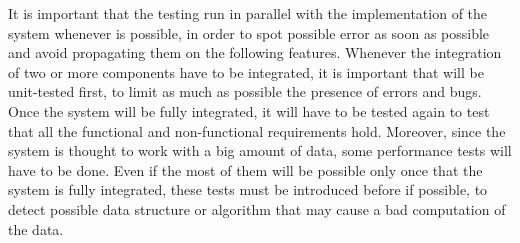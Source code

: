 \documentclass[../RASD.tex]{subfiles}
\begin{document}
    It is important that the testing run in parallel with the implementation of the system whenever is possible, in order to spot possible error
    as soon as possible and avoid propagating them on the following features.
    Whenever the integration of two or more components have to be integrated,
    it is important that will be unit-tested first, to limit as much as possible the presence of errors and bugs.
    Once the system will be fully integrated, it will have to be tested again to test that all the functional and non-functional requirements hold.
    Moreover, since the system is thought to work with a big amount of data, some performance tests will have to be done.
    Even if the most of them will be possible only once that the system is fully integrated, these tests must be introduced before if possible,
    to detect possible data structure or algorithm that may cause a bad computation of the data.
    \newpage
\end{document}
